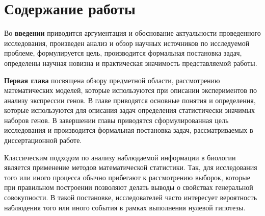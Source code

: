 \section*{Содержание работы}
Во \textbf{введении} приводится аргументация и обоснование актуальности проведенного исследования, произведен анализ и обзор научных источников по исследуемой проблеме, формулируется цель, производится формальная постановка задач, определены научная новизна и практическая значимость представляемой работы.


\textbf{Первая глава} посвящена обзору предметной области, рассмотрению математических моделей, которые используются при описании экспериментов по анализу экспрессии генов.
В главе приводятся основные понятия и определения, которые используются для описания задач определения статистически значимых наборов генов.
В завершении главы приводятся сформулированная цель исследования и производится формальная постановка задач, рассматриваемых в диссертационной работе.

Классическим подходом по анализу наблюдаемой информации в биологии является применение методов математической статистики.
Так, для исследования того или иного процесса обычно прибегают к рассмотрению выборок, которые при правильном построении позволяют делать выводы о свойствах генеральной совокупности. 
В такой постановке, исследователей часто интересует вероятность наблюдения того или иного события в рамках выполнения нулевой гипотезы.

